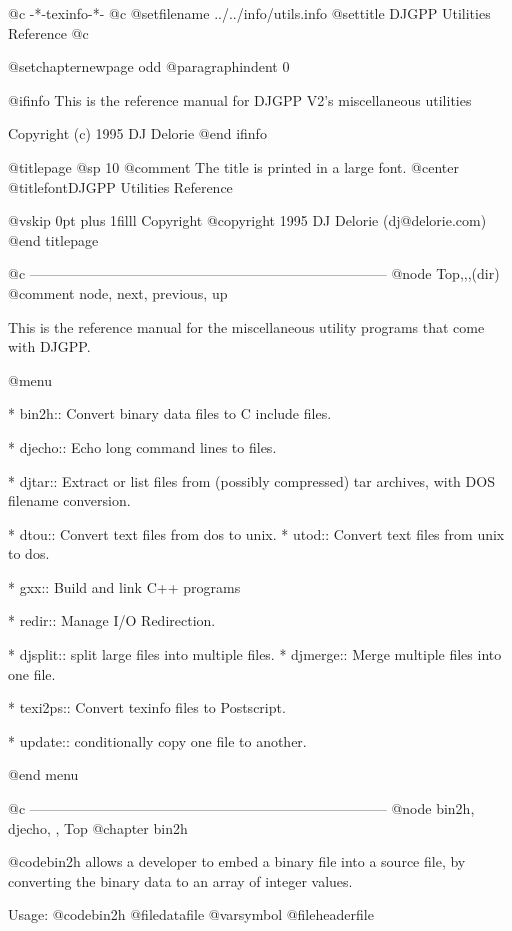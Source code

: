    @c -*-texinfo-*-
@c %
@setfilename ../../info/utils.info
@settitle DJGPP Utilities Reference
@c %

@setchapternewpage odd
@paragraphindent 0

@ifinfo
This is the reference manual for DJGPP V2's miscellaneous utilities

Copyright (c) 1995 DJ Delorie
@end ifinfo

@titlepage
@sp 10
@comment The title is printed in a large font.
@center @titlefont{DJGPP Utilities Reference}

@vskip 0pt plus 1filll
Copyright @copyright{} 1995 DJ Delorie (dj@delorie.com)
@end titlepage

@c -----------------------------------------------------------------------------
@node Top,,,(dir)
@comment node, next, previous, up

This is the reference manual for the miscellaneous utility programs that
come with DJGPP.

@menu

* bin2h::       Convert binary data files to C include files.

* djecho::      Echo long command lines to files.

* djtar::       Extract or list files from (possibly compressed)
		tar archives, with DOS filename conversion.

* dtou::        Convert text files from dos to unix.
* utod::        Convert text files from unix to dos.

* gxx::         Build and link C++ programs

* redir::       Manage I/O Redirection.

* djsplit::     split large files into multiple files.
* djmerge::     Merge multiple files into one file.

* texi2ps::     Convert texinfo files to Postscript.

* update::      conditionally copy one file to another.

@end menu

@c -----------------------------------------------------------------------------
@node bin2h, djecho, , Top
@chapter bin2h

@code{bin2h} allows a developer to embed a binary file into a source
file, by converting the binary data to an array of integer values.

Usage: @code{bin2h} @file{datafile} @var{symbol} @file{headerfile}

